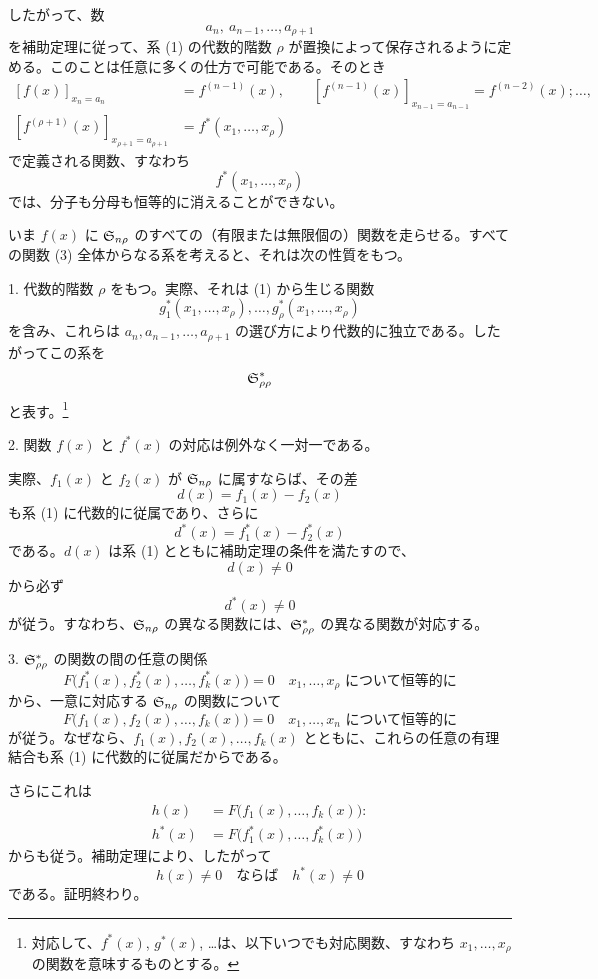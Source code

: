 \documentclass[11pt]{jlreq}
\begin{document}
したがって、数
\[
  a_n,\ a_{n-1},\ldots,a_{\rho+1}
\]
を補助定理に従って、系 (1) の代数的階数 $\rho$ が置換によって保存されるように定める。このことは任意に多くの仕方で可能である。そのとき
\[
\begin{aligned}
 [f(x)]_{x_n=a_n}&=f^{(n-1)}(x),\qquad
 [f^{(n-1)}(x)]_{x_{n-1}=a_{n-1}}=f^{(n-2)}(x);\ldots,\\
 [f^{(\rho+1)}(x)]_{x_{\rho+1}=a_{\rho+1}}&=f^*(x_1,\ldots,x_\rho)
\end{aligned}
\]
で定義される関数、すなわち
\begin{equation}
  f^*(x_1,\ldots,x_\rho)
\tag{3}
\end{equation}
では、分子も分母も恒等的に消えることができない。

いま $f(x)$ に $\mathfrak{S}_{n\rho}$ のすべての（有限または無限個の）関数を走らせる。すべての関数 (3) 全体からなる系を考えると、それは次の性質をもつ。

1. 代数的階数 $\rho$ をもつ。実際、それは (1) から生じる関数
\[
  g_1^*(x_1,\ldots,x_\rho),\ldots,g_\rho^*(x_1,\ldots,x_\rho)
\]
を含み、これらは $a_n,a_{n-1},\ldots,a_{\rho+1}$ の選び方により代数的に独立である。したがってこの系を
\[
  \mathfrak{S}^*_{\rho\rho}
\]
と表す。\footnote{対応して、$f^*(x)$, $g^*(x)$, \ldots は、以下いつでも対応関数、すなわち $x_1,\ldots,x_\rho$ の関数を意味するものとする。}

2. 関数 $f(x)$ と $f^*(x)$ の対応は例外なく一対一である。

実際、$f_1(x)$ と $f_2(x)$ が $\mathfrak{S}_{n\rho}$ に属すならば、その差
\[
  d(x)=f_1(x)-f_2(x)
\]
も系 (1) に代数的に従属であり、さらに
\[
  d^*(x)=f_1^*(x)-f_2^*(x)
\]
である。$d(x)$ は系 (1) とともに補助定理の条件を満たすので、
\[
  d(x)\ne0
\]
から必ず
\[
  d^*(x)\ne0
\]
が従う。すなわち、$\mathfrak{S}_{n\rho}$ の異なる関数には、$\mathfrak{S}^*_{\rho\rho}$ の異なる関数が対応する。

3. $\mathfrak{S}^*_{\rho\rho}$ の関数の間の任意の関係
\[
  F\bigl(f_1^*(x),f_2^*(x),\ldots,f_k^*(x)\bigr)=0
  \quad\text{$x_1,\ldots,x_\rho$ について恒等的に}
\]
から、一意に対応する $\mathfrak{S}_{n\rho}$ の関数について
\[
  F\bigl(f_1(x),f_2(x),\ldots,f_k(x)\bigr)=0
  \quad\text{$x_1,\ldots,x_n$ について恒等的に}
\]
が従う。なぜなら、$f_1(x),f_2(x),\ldots,f_k(x)$ とともに、これらの任意の有理結合も系 (1) に代数的に従属だからである。

さらにこれは
\begin{equation}
\begin{aligned}
 h(x)&=F\bigl(f_1(x),\ldots,f_k(x)\bigr):\\
 h^*(x)&=F\bigl(f_1^*(x),\ldots,f_k^*(x)\bigr)
\end{aligned}
\tag{4}
\end{equation}
からも従う。補助定理により、したがって
\[
  h(x)\ne0\quad\text{ならば}\quad h^*(x)\ne0
\]
である。証明終わり。
\end{document}
